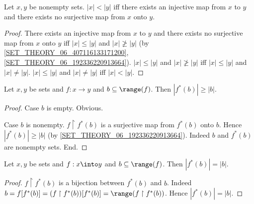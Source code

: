 \documentclass[../set-theory.tex]{subfiles}
\begin{document}
  \begin{forthel}
    \begin{proposition}
      Let $x, y$ be nonempty sets.
      $|x| < |y|$ iff there exists an injective map from $x$ to $y$ and there
      exists no surjective map from $x$ onto $y$.
    \end{proposition}
    \begin{proof}
      There exists an injective map from $x$ to $y$ and there exists no
      surjective map from $x$ onto $y$ iff $|x| \leq |y|$ and $|x| \ngeq |y|$
      (by \cref{SET_THEORY_06_407116133171200},
      \cref{SET_THEORY_06_192336220913664}).
      $|x| \leq |y|$ and $|x| \ngeq |y|$ iff $|x| \leq |y|$ and $|x| \neq |y|$.
      $|x| \leq |y|$ and $|x| \neq |y|$ iff $|x| < |y|$.
    \end{proof}
  \end{forthel}

  \begin{forthel}
    \begin{proposition}
      Let $x, y$ be sets and $f : x \to y$ and $b \subseteq \range(f)$.
      Then $|f^{*}(b)| \geq |b|$.
    \end{proposition}
    \begin{proof}
      Case $b$ is empty. Obvious.

      Case $b$ is nonempty.
        $f \restriction f^{*}(b)$ is a surjective map from $f^{*}(b)$ onto $b$.
        Hence $|f^{*}(b)| \geq |b|$ (by \cref{SET_THEORY_06_192336220913664}).
        Indeed $b$ and $f^{*}(b)$ are nonempty sets.
      End.
    \end{proof}
  \end{forthel}

  \begin{forthel}
    \begin{proposition}
      Let $x, y$ be sets and $f : x \into y$ and $b \subseteq \range(f)$.
      Then $|f^{*}(b)| = |b|$.
    \end{proposition}
    \begin{proof}
      $f \restriction f^{*}(b)$ is a bijection between $f^{*}(b)$ and $b$.
      Indeed $b
        = f[f^{*}(b)]
        = (f \restriction f^{*}(b))[f^{*}(b)]
        = \range(f \restriction f^{*}(b))$.
      Hence $|f^{*}(b)| = |b|$.
    \end{proof}
  \end{forthel}
\end{document}
